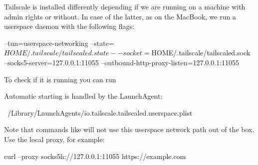 
\label{sec:tailscale-setup}
Tailscale is installed differently depending if we are running on a machine with admin rights or without.
In case of the latter, as on the MacBook, we run a userspace 
daemon with the following flags:
\begin{DocCode}
    --tun=userspace-networking
    --state=$HOME/.tailscale/tailscaled.state
    --socket=$HOME/.tailscale/tailscaled.sock
    --socks5-server=127.0.0.1:11055
    --outbound-http-proxy-listen=127.0.0.1:11055
\end{DocCode}
To check if it is running you can run
Automatic starting is handled by the LaunchAgent:
\begin{DocCode}
    ~/Library/LaunchAgents/io.tailscale.tailscaled.userspace.plist
\end{DocCode}

Note that commands like  will not use this userspace network path
out of the box. Use the local proxy, for example:
\begin{DocCode}
    curl --proxy socks5h://127.0.0.1:11055 https://example.com
\end{DocCode}

